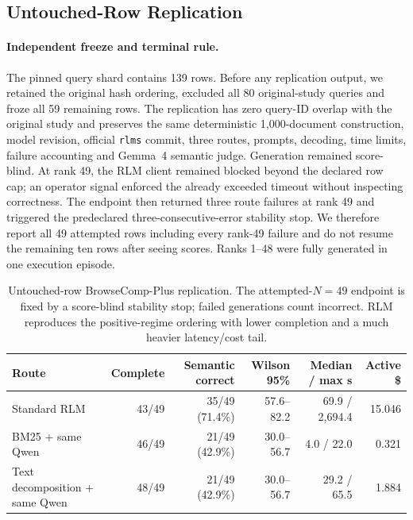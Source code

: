 \documentclass[letterpaper]{article}
\begin{document}
\subsection{Untouched-Row Replication}

\paragraph{Independent freeze and terminal rule.}
The pinned query shard contains 139 rows. Before any replication output, we retained the original hash ordering, excluded all 80 original-study queries and froze all 59 remaining rows. The replication has zero query-ID overlap with the original study and preserves the same deterministic 1,000-document construction, model revision, official \texttt{rlms} commit, three routes, prompts, decoding, time limits, failure accounting and Gemma~4 semantic judge. Generation remained score-blind. At rank 49, the RLM client remained blocked beyond the declared row cap; an operator signal enforced the already exceeded timeout without inspecting correctness. The endpoint then returned three route failures at rank 49 and triggered the predeclared three-consecutive-error stability stop. We therefore report all 49 attempted rows including every rank-49 failure and do not resume the remaining ten rows after seeing scores. Ranks 1--48 were fully generated in one execution episode.

\makeatletter
\setlength{\@dblfptop}{0pt}
\setlength{\@dblfpsep}{10pt}
\setlength{\@dblfpbot}{0pt plus 1fil}
\makeatother

\begin{table}[!t]
\centering
\small
\setlength{\tabcolsep}{3pt}
\begin{tabular}{@{}lrrrrr@{}}
\toprule
\textbf{Route} & \textbf{Complete} & \textbf{Semantic correct} & \textbf{Wilson 95\%} & \textbf{Median / max s} & \textbf{Active \$} \\
\midrule
Standard RLM & 43/49 & 35/49 (71.4\%) & 57.6--82.2 & 69.9 / 2,694.4 & 15.046 \\
BM25 + same Qwen & 46/49 & 21/49 (42.9\%) & 30.0--56.7 & 4.0 / 22.0 & 0.321 \\
Text decomposition + same Qwen & 48/49 & 21/49 (42.9\%) & 30.0--56.7 & 29.2 / 65.5 & 1.884 \\
\bottomrule
\end{tabular}
\caption{Untouched-row BrowseComp-Plus replication. The attempted-$N=49$ endpoint is fixed by a score-blind stability stop; failed generations count incorrect. RLM reproduces the positive-regime ordering with lower completion and a much heavier latency/cost tail.}
\label{tab:supp-browsecomp-replication}
\end{table}
\end{document}
